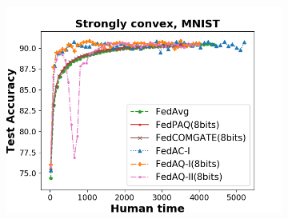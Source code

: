 \begin{figure}[hbt!]
\begin{subfigure}[b]{0.31\textwidth}
    \includegraphics[width=\textwidth]{figure/accuracy_iid_time_str_cvx.png}
    \end{subfigure}
    

\end{figure}
